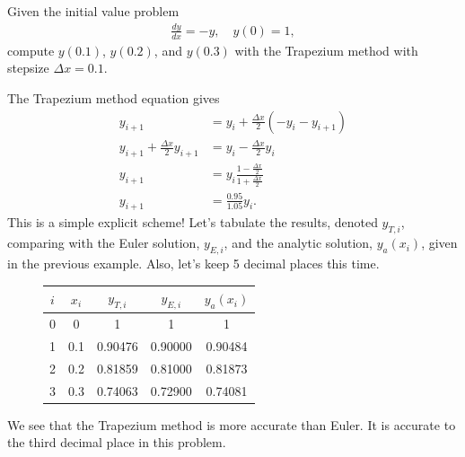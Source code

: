 \exemple{\upline}
{
Given the initial value problem
\begin{align*}
\frac{dy}{dx} = -y, \quad y(0)=1,
\end{align*}
compute $y(0.1)$, $y(0.2)$, and $y(0.3)$ with the Trapezium method with stepsize $\Delta x=0.1$.

\noindent The Trapezium method equation gives
\begin{align*}
y_{i+1} &= y_i + \frac{\Delta x}{2} \left( -y_i - y_{i+1} \right) \\
%
y_{i+1} + \frac{\Delta x}{2} y_{i+1} &= y_i  -\frac{\Delta x}{2}  y_i  \\
%
y_{i+1} &= y_i\frac{1 - \frac{\Delta x}{2}}{1 + \frac{\Delta x}{2}}  \\
%
y_{i+1} &= \frac{0.95}{1.05} y_i.
\end{align*}
This is a simple explicit scheme! Let's tabulate the results, denoted $y_{T,i}$, comparing with the Euler solution, $y_{E,i}$, and the analytic solution, $y_{a}(x_i)$, given in the previous example. Also, let's keep 5 decimal places this time.
\begin{figure}[H]
\centering
\begin{tabular}{ccccc}
$i$ & $x_i$ & $y_{T,i}$ & $y_{E,i}$ & $y_{a}(x_i)$ \\ \hline
0 & 0   & 1       & 1     & 1         \\
1 & 0.1 & 0.90476 & 0.90000 & 0.90484 \\
2 & 0.2 & 0.81859 & 0.81000 & 0.81873 \\
3 & 0.3 & 0.74063 & 0.72900 & 0.74081
\end{tabular}
\end{figure}
We see that the Trapezium method is more accurate than Euler. It is accurate to the third decimal place in this problem.
}{\downline}

